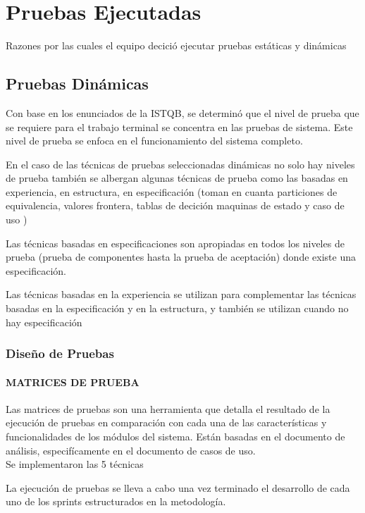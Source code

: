 \chapter{Pruebas Ejecutadas} \label{cap:ocho}
Razones por las cuales el equipo decició ejecutar pruebas estáticas y dinámicas
\section{Pruebas Dinámicas}

Con base en los enunciados de la ISTQB, se determinó que el nivel de prueba que se requiere para el trabajo terminal se concentra en las pruebas de sistema. Este nivel de prueba se enfoca en el funcionamiento del sistema completo.

En el caso de las técnicas de pruebas seleccionadas  dinámicas no solo hay niveles de prueba también se albergan algunas técnicas de prueba como las basadas en experiencia, en estructura, en especificación (toman en cuanta particiones de equivalencia, valores frontera, tablas de decición maquinas de estado y caso de uso )

Las técnicas basadas en especificaciones son apropiadas en todos los niveles de prueba (prueba de componentes hasta la prueba de aceptación) donde existe una especificación.

Las técnicas basadas en la experiencia se utilizan para complementar las técnicas basadas en la especificación y en la estructura, y también se utilizan cuando no hay especificación

\subsection{Diseño de Pruebas}

\subsubsection{MATRICES DE PRUEBA}

Las matrices de pruebas son una herramienta que detalla el resultado de la ejecución de pruebas en comparación con cada una de las características y funcionalidades de los módulos del sistema. Están basadas en el documento de análisis, especifícamente en el documento de casos de uso.\\

Se implementaron las 5 técnicas 

La ejecución de pruebas se lleva a cabo una vez terminado el desarrollo de cada uno de los sprints estructurados en la metodología.\\

